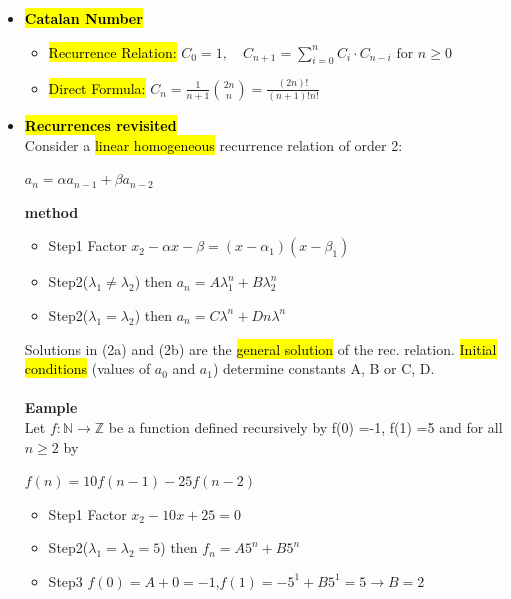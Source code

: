 \documentclass{article}
\begin{document}
\begin{itemize}
================================================================================================================
\newpage
================================================================================================================

\item \hl{\textbf{Catalan Number} }
\begin{itemize}
\item \hl{Recurrence Relation:} $C_0 = 1, \quad C_{n+1} = \sum_{i=0}^{n} C_i \cdot C_{n-i} \text{ for } n \geq 0 $
\item \hl{Direct Formula:} $C_n = \frac{1}{n+1} \binom{2n}{n} = \frac{(2n)!}{(n+1)!n!}$
\end{itemize}

\item \hl{\textbf{Recurrences revisited}}\\
Consider a \hl{linear homogeneous} recurrence relation of order 2:
\begin{center}
$a_n = \alpha a_{n-1} + \beta a_{n-2}$
\end{center}

\textbf{method}
\begin{itemize}
\item {Step1} Factor $x_2 - \alpha x - \beta = (x - \alpha_1)(x - \beta_1)$
\item {Step2($\lambda_1 \neq \lambda_2$)}  then $a_n = A \lambda_1^n + B \lambda_2^n$
\item {Step2($\lambda_1 = \lambda_2$)}  then $a_n = C \lambda^n + Dn \lambda^n$
\end{itemize}

Solutions in (2a) and (2b) are the \hl{general solution} of the rec. relation.
\hl{Initial conditions} (values of $a_0$ and $a_1$) determine constants A, B or C, D.\\\\
\textbf{Eample}\\
Let $f : \mathbb{N} \rightarrow \mathbb{Z}$ be a function defined recursively by f(0) =-1, f(1) =5 and for all $n \geq 2$ by 
\begin{center}
$f(n) = 10 f(n-1) - 25 f(n-2)$
\end{center}

\begin{itemize}
\item {Step1} Factor $x_2 -10x + 25 = 0$
\item {Step2($\lambda_1 = \lambda_2 = 5$)}  then $f_n = A 5^n + B 5^n$
\item {Step3} $f(0)= A + 0 = -1$,$f(1) = -5^1 + B5^1 = 5 \rightarrow B = 2$
\end{itemize}


\end{itemize}
\end{document}
